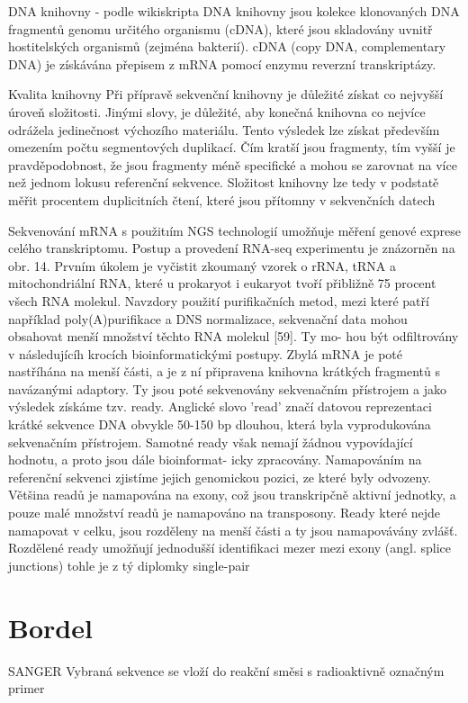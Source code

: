 \documentclass[czech,DP]{thesiskiv}
\begin{document}
DNA knihovny - podle wikiskripta
DNA knihovny jsou kolekce klonovaných DNA fragmentů genomu určitého organismu (cDNA), které jsou skladovány uvnitř hostitelských organismů (zejména bakterií). cDNA (copy DNA, complementary DNA) je získávána přepisem z mRNA pomocí enzymu reverzní transkriptázy.

Kvalita knihovny
Při přípravě sekvenční knihovny je důležité získat co nejvyšší úroveň složitosti. Jinými slovy, je důležité, aby konečná knihovna co nejvíce odrážela jedinečnost výchozího materiálu. Tento výsledek lze získat především omezením počtu segmentových duplikací. Čím kratší jsou fragmenty, tím vyšší je pravděpodobnost, že jsou fragmenty méně specifické a mohou se zarovnat na více než jednom lokusu referenční sekvence. Složitost knihovny lze tedy v podstatě měřit procentem duplicitních čtení, které jsou přítomny v sekvenčních datech

Sekvenování mRNA s použitıím NGS technologií umožňuje měření genové exprese celého
transkriptomu. Postup a provedení RNA-seq experimentu je znázorněn na obr. 14.
Prvním úkolem je vyčistit zkoumaný vzorek o rRNA, tRNA a mitochondriální RNA,
které u prokaryot i eukaryot tvoří přibližně 75 procent všech RNA molekul. Navzdory použití
purifikačních metod, mezi které patří například poly(A)purifikace a DNS normalizace,
sekvenační data mohou obsahovat menší množství těchto RNA molekul [59]. Ty mo-
hou být odfiltrovány v následujícíh krocích bioinformatickými postupy. Zbylá mRNA
je poté nastříhána na menší části, a je z ní připravena knihovna krátkých fragmentů s
navázanými adaptory. Ty jsou poté sekvenovány sekvenačním přístrojem a jako výsledek
získáme tzv. ready. Anglické slovo ’read’ značí datovou reprezentaci krátké sekvence
DNA obvykle 50-150 bp dlouhou, která byla vyprodukována sekvenačním přístrojem.
Samotné ready však nemají žádnou vypovídající hodnotu, a proto jsou dále bioinformat-
icky zpracovány. Namapováním na referenční sekvenci zjistíme jejich genomickou pozici,
ze které byly odvozeny. Většina readů je namapována na exony, což jsou transkripčně
aktivní jednotky, a pouze malé množství readů je namapováno na transposony. Ready
které nejde namapovat v celku, jsou rozděleny na menší části a ty jsou namapovávány
zvlášť. Rozdělené ready umožňují jednodušší identifikaci mezer mezi exony (angl. splice
junctions)
tohle je z tý diplomky single-pair
\section{Bordel}
SANGER
Vybraná sekvence se vloží do reakční směsi s radioaktivně označným primer  
\end{document}
